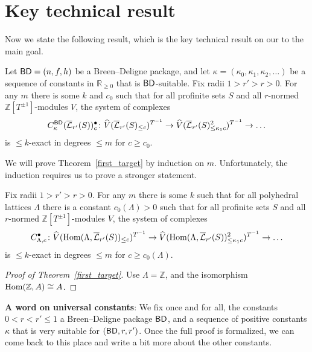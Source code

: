 \section{Key technical result}

Now we state the following result, which is the key technical result on our to the main goal.

\begin{theorem}
  \label{first_target}
  \leanok
  Let $\mathsf{BD} = (n,f,h)$ be a Breen--Deligne package,
  and let $\kappa = (\kappa_0, \kappa_1, \kappa_2, \dots)$ be a sequence of constants in $\mathbb R_{\ge 0}$
  that is $\mathsf{BD}$-suitable.
	Fix radii $1>r'>r>0$.
  For any $m$ there is some $k$ and $c_0$ such that for all profinite sets $S$ and all $r$-normed $\mathbb Z[T^{\pm 1}]$-modules $V$,
  the system of complexes
  \[
    C^{\mathsf{BD}}_{\kappa}(\overline{\mathcal L}_{r'}(S))_c^\bullet \colon
    \widehat{V}(\overline{\mathcal L}_{r'}(S)_{\leq c})^{T^{-1}} \to
    \widehat{V}(\overline{\mathcal L}_{r'}(S)_{\leq \kappa_1c}^2)^{T^{-1}}
    \to \ldots
  \]
  is $\leq k$-exact in degrees $\leq m$ for $c\geq c_0$.
\end{theorem}

We will prove Theorem~\ref{first_target} by induction on $m$.
Unfortunately, the induction requires us to prove a stronger statement.

\begin{theorem}
  \label{explicit}
  \leanok
  Fix radii $1>r'>r>0$. For any $m$ there is some $k$
  such that for all polyhedral lattices $\Lambda$
  there is a constant $c_0(\Lambda)>0$
  such that for all profinite sets $S$
  and all $r$-normed $\mathbb Z[T^{\pm 1}]$-modules $V$,
  the system of complexes
  \[
  C_{\Lambda,c}^\bullet \colon
  \widehat{V}(\operatorname{Hom}(\Lambda,\overline{\mathcal L}_{r'}(S))_{\leq c})^{T^{-1}} \to
  \widehat{V}(\operatorname{Hom}(\Lambda,\overline{\mathcal L}_{r'}(S))_{\leq \kappa_1c}^2)^{T^{-1}} \to \ldots
  \]
  is $\leq k$-exact in degrees $\leq m$ for $c\geq c_0(\Lambda)$.
\end{theorem}

\begin{proof}[{Proof of Theorem~\ref{first_target}}]
  \leanok
  Use $\Lambda = \mathbb Z$, and the isomorphism $\operatorname{Hom}(\mathbb Z, A) \cong A$.
\end{proof}

\textbf{A word on universal constants}:
We fix once and for all, the constants $0 < r < r' \le 1$
a Breen--Deligne package $\mathsf{BD}$,
and a sequence of positive constants $\kappa$ that is very suitable for $(\mathsf{BD}, r, r')$.
Once the full proof is formalized,
we can come back to this place and write a bit more about the other constants.

